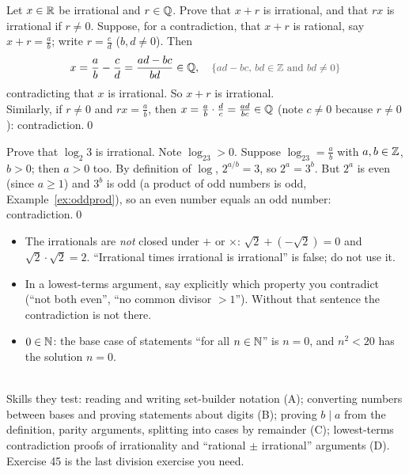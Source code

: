 \begin{hexample}\label{ex:irrplus}
Let $x\in\mathbb{R}$ be irrational and $r\in\mathbb{Q}$. Prove that $x+r$ is irrational, and that $rx$ is irrational if $r\neq0$.
\solution
Suppose, for a contradiction, that $x+r$ is rational, say $x+r=\frac ab$; write $r=\frac cd$ ($b,d\neq0$). Then
\[
x=\frac ab-\frac cd=\frac{ad-bc}{bd}\in\Q,\reason{$ad-bc,\,bd\in\Z$ and $bd\neq0$}
\]
contradicting that $x$ is irrational. So $x+r$ is irrational.\\
Similarly, if $r\neq0$ and $rx=\frac ab$, then $x=\frac ab\cdot\frac dc=\frac{ad}{bc}\in\mathbb{Q}$ (note $c\neq0$ because $r\neq0$): contradiction.\qed
\end{hexample}

\begin{hexample}
Prove that $\log_2 3$ is irrational.
\solution
Note $\log_23>0$. Suppose $\log_23=\frac ab$ with $a,b\in\mathbb{Z}$, $b>0$; then $a>0$ too. By definition of $\log$, $2^{a/b}=3$, so $2^a=3^b$. But $2^a$ is even (since $a\ge1$) and $3^b$ is odd (a product of odd numbers is odd, Example~\ref{ex:oddprod}), so an even number equals an odd number: contradiction.\qed
\end{hexample}

\begin{warn}
\begin{itemize}
\item The irrationals are \emph{not} closed under $+$ or $\times$: $\sqrt2+(-\sqrt2)=0$ and $\sqrt2\cdot\sqrt2=2$. ``Irrational times irrational is irrational'' is false; do not use it.
\item In a lowest-terms argument, say explicitly which property you contradict (``not both even'', ``no common divisor $>1$''). Without that sentence the contradiction is not there.
\item $0\in\mathbb{N}$: the base case of statements ``for all $n\in\mathbb{N}$'' is $n=0$, and $n^2<20$ has the solution $n=0$.
\end{itemize}
\end{warn}

\begin{planning}
\qquad {}\\[3pt]
Skills they test: reading and writing set-builder notation (A); converting numbers between bases and proving statements about digits (B); proving $b\mid a$ from the definition, parity arguments, splitting into cases by remainder (C); lowest-terms contradiction proofs of irrationality and ``rational $\pm$ irrational'' arguments (D). Exercise 45 is the last division exercise you need.
\end{planning}

